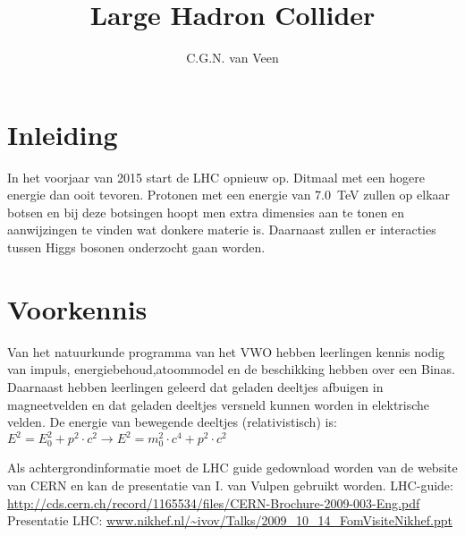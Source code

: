 

\usepackage{hepnames}
\usepackage[version=3]{mhchem}
\usepackage{lipsum}
\usepackage{pgfplots}
\usepackage{amsmath}
\usepackage{tikz}
\usetikzlibrary{shapes}
\usetikzlibrary{positioning,arrows}
\usetikzlibrary{decorations.pathmorphing}
\usetikzlibrary{decorations.markings}


\DeclareRobustCommand{\PgDpp}{\HepParticle{\Delta}{}{++}\xspace}

\title{Large Hadron Collider}
\author{C.G.N. van Veen}



\maketitle

\section{Inleiding} In het voorjaar van 2015 start de LHC opnieuw op. Ditmaal
met een hogere energie dan ooit tevoren. Protonen met een energie van \SI{7.0}{\tera\electronvolt}
zullen op elkaar botsen en bij deze botsingen hoopt men extra dimensies aan te tonen en
aanwijzingen te vinden wat donkere materie is. Daarnaast zullen er interacties tussen Higgs bosonen
onderzocht gaan worden.

\section{Voorkennis}

Van het natuurkunde programma van het VWO hebben leerlingen kennis nodig van impuls,
energiebehoud,atoommodel en de beschikking hebben over een Binas.
Daarnaast hebben leerlingen geleerd dat geladen deeltjes afbuigen in magneetvelden en dat
geladen deeltjes versneld kunnen worden in elektrische velden.
De energie van bewegende deeltjes (relativistisch) is:\\
$E^2 = E_0^2 + p^2 \cdot c^2 \rightarrow  E^2 = m_0^2 \cdot c^4 + p^2 \cdot c^2 $

Als achtergrondinformatie moet de LHC guide gedownload worden van de
website van CERN en kan de presentatie van I. van Vulpen gebruikt worden.
LHC-guide: \url{http://cds.cern.ch/record/1165534/files/CERN-Brochure-2009-003-Eng.pdf}
Presentatie LHC: \url{www.nikhef.nl/~ivov/Talks/2009_10_14_FomVisiteNikhef.ppt}


